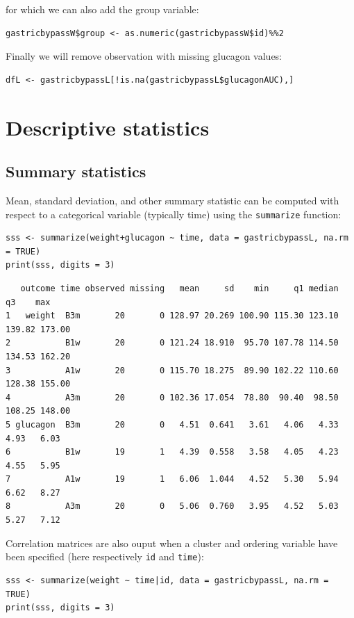 \documentclass[12pt]{article}
\begin{document}
for which we can also add the group variable:
\lstset{language=r,label= ,caption= ,captionpos=b,numbers=none}
\begin{lstlisting}
gastricbypassW$group <- as.numeric(gastricbypassW$id)%%2
\end{lstlisting}

Finally we will remove observation with missing glucagon values:
\lstset{language=r,label= ,caption= ,captionpos=b,numbers=none}
\begin{lstlisting}
dfL <- gastricbypassL[!is.na(gastricbypassL$glucagonAUC),]
\end{lstlisting}

\clearpage

\section{Descriptive statistics}
\label{sec:org1565a4e}
\subsection{Summary statistics}
\label{sec:orgfa1411a}

Mean, standard deviation, and other summary statistic can be computed
with respect to a categorical variable (typically time) using the
\texttt{summarize} function:
\lstset{language=r,label= ,caption= ,captionpos=b,numbers=none}
\begin{lstlisting}
sss <- summarize(weight+glucagon ~ time, data = gastricbypassL, na.rm = TRUE)
print(sss, digits = 3)
\end{lstlisting}

\begin{verbatim}
   outcome time observed missing   mean     sd    min     q1 median     q3    max
1   weight  B3m       20       0 128.97 20.269 100.90 115.30 123.10 139.82 173.00
2           B1w       20       0 121.24 18.910  95.70 107.78 114.50 134.53 162.20
3           A1w       20       0 115.70 18.275  89.90 102.22 110.60 128.38 155.00
4           A3m       20       0 102.36 17.054  78.80  90.40  98.50 108.25 148.00
5 glucagon  B3m       20       0   4.51  0.641   3.61   4.06   4.33   4.93   6.03
6           B1w       19       1   4.39  0.558   3.58   4.05   4.23   4.55   5.95
7           A1w       19       1   6.06  1.044   4.52   5.30   5.94   6.62   8.27
8           A3m       20       0   5.06  0.760   3.95   4.52   5.03   5.27   7.12
\end{verbatim}


Correlation matrices are also ouput when a cluster and ordering
variable have been specified (here respectively \texttt{id} and \texttt{time}):
\lstset{language=r,label= ,caption= ,captionpos=b,numbers=none}
\begin{lstlisting}
sss <- summarize(weight ~ time|id, data = gastricbypassL, na.rm = TRUE)
print(sss, digits = 3)
\end{lstlisting}
\end{document}
